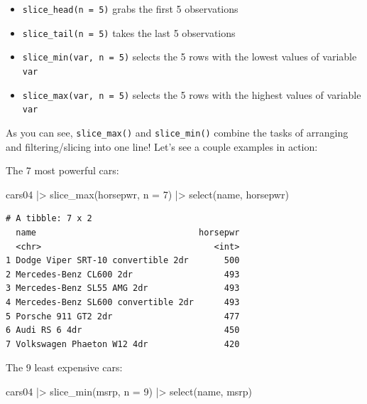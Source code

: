 \documentclass[
  letterpaper,
]{book}
\newenvironment{Shaded}{\begin{snugshade}}{\end{snugshade}}
\newcommand{\AttributeTok}[1]{\textcolor[rgb]{0.40,0.45,0.13}{#1}}
\newcommand{\DecValTok}[1]{\textcolor[rgb]{0.68,0.00,0.00}{#1}}
\newcommand{\FunctionTok}[1]{\textcolor[rgb]{0.28,0.35,0.67}{#1}}
\newcommand{\NormalTok}[1]{\textcolor[rgb]{0.00,0.23,0.31}{#1}}
\newcommand{\SpecialCharTok}[1]{\textcolor[rgb]{0.37,0.37,0.37}{#1}}
\providecommand{\tightlist}{%
  \setlength{\itemsep}{0pt}\setlength{\parskip}{0pt}}\usepackage{longtable,booktabs,array}
\begin{document}
\begin{itemize}
\tightlist
\item
  \texttt{slice\_head(n\ =\ 5)} grabs the first 5 observations
\item
  \texttt{slice\_tail(n\ =\ 5)} takes the last 5 observations
\item
  \texttt{slice\_min(var,\ n\ =\ 5)} selects the 5 rows with the lowest
  values of variable \texttt{var}
\item
  \texttt{slice\_max(var,\ n\ =\ 5)} selects the 5 rows with the highest
  values of variable \texttt{var}
\end{itemize}

As you can see, \texttt{slice\_max()} and \texttt{slice\_min()} combine
the tasks of arranging and filtering/slicing into one line! Let's see a
couple examples in action:

The 7 most powerful cars:

\begin{Shaded}
\begin{Highlighting}[]
\NormalTok{cars04 }\SpecialCharTok{|\textgreater{}} 
  \FunctionTok{slice\_max}\NormalTok{(horsepwr, }\AttributeTok{n =} \DecValTok{7}\NormalTok{) }\SpecialCharTok{|\textgreater{}} 
  \FunctionTok{select}\NormalTok{(name, horsepwr)}
\end{Highlighting}
\end{Shaded}

\begin{verbatim}
# A tibble: 7 x 2
  name                                horsepwr
  <chr>                                  <int>
1 Dodge Viper SRT-10 convertible 2dr       500
2 Mercedes-Benz CL600 2dr                  493
3 Mercedes-Benz SL55 AMG 2dr               493
4 Mercedes-Benz SL600 convertible 2dr      493
5 Porsche 911 GT2 2dr                      477
6 Audi RS 6 4dr                            450
7 Volkswagen Phaeton W12 4dr               420
\end{verbatim}

The 9 least expensive cars:

\begin{Shaded}
\begin{Highlighting}[]
\NormalTok{cars04 }\SpecialCharTok{|\textgreater{}} 
  \FunctionTok{slice\_min}\NormalTok{(msrp, }\AttributeTok{n =} \DecValTok{9}\NormalTok{) }\SpecialCharTok{|\textgreater{}} 
  \FunctionTok{select}\NormalTok{(name, msrp)}
\end{Highlighting}
\end{Shaded}
\end{document}
